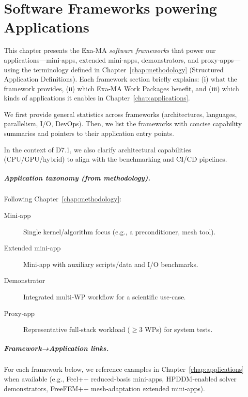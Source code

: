 \clearpage
\chapter{Software Frameworks powering Applications}
\label{chap:software}

This chapter presents the Exa-MA \emph{software frameworks} that power our applications—mini‑apps, extended mini‑apps, demonstrators, and proxy‑apps—using the terminology defined in Chapter~\ref{chap:methodology} (Structured Application Definitions). Each framework section briefly explains: (i) what the framework provides, (ii) which Exa‑MA Work Packages benefit, and (iii) which kinds of applications it enables in Chapter~\ref{chap:applications}.

We first provide general statistics across frameworks (architectures, languages, parallelism, I/O, DevOps). Then, we list the frameworks with concise capability summaries and pointers to their application entry points.

In the context of D7.1, we also clarify architectural capabilities (CPU/GPU/hybrid) to align with the benchmarking and CI/CD pipelines.

\paragraph{Application taxonomy (from methodology).}
Following Chapter~\ref{chap:methodology}:
\begin{description}
    \item[Mini‑app] Single kernel/algorithm focus (e.g., a preconditioner, mesh tool).
    \item[Extended mini‑app] Mini‑app with auxiliary scripts/data and I/O benchmarks.
    \item[Demonstrator] Integrated multi‑WP workflow for a scientific use‑case.
    \item[Proxy‑app] Representative full‑stack workload ($\geq 3$ WPs) for system tests.
\end{description}

\paragraph{Framework→Application links.}
For each framework below, we reference examples in Chapter~\ref{chap:applications} when available (e.g., Feel++ reduced‑basis mini‑apps, HPDDM‑enabled solver demonstrators, FreeFEM++ mesh‑adaptation extended mini‑apps).


